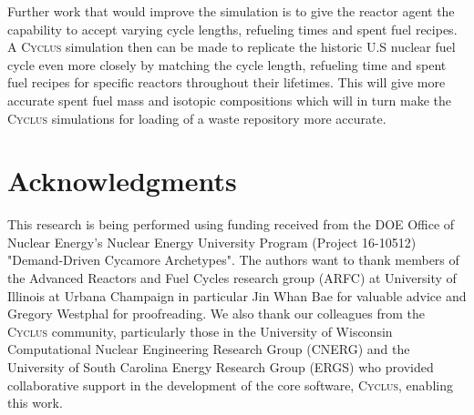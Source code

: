 \documentclass{anstrans}
\newcommand{\Cyclus}{\textsc{Cyclus}\xspace}%
\begin{document}
Further work that would improve the simulation is to give the reactor agent the capability to accept varying cycle lengths, refueling times and spent fuel recipes. A \Cyclus simulation then can be made to replicate the historic U.S nuclear fuel cycle even more closely by matching the cycle length, refueling time and spent fuel recipes for specific reactors throughout their lifetimes. This will give more accurate spent fuel mass and isotopic compositions which will in turn make the \Cyclus simulations for loading of a waste repository more accurate. 

\section{Acknowledgments}
This research is being performed using funding received from the DOE Office of Nuclear Energy's
Nuclear Energy University Program (Project 16-10512) "Demand-Driven Cycamore Archetypes". The authors want to thank members of the Advanced Reactors and Fuel Cycles research group (ARFC) at University of Illinois at Urbana Champaign in particular Jin Whan Bae for valuable advice and Gregory Westphal for proofreading. We also thank our colleagues from the \Cyclus community, particularly those in the University of Wisconsin Computational Nuclear Engineering Research Group (CNERG) and the University of South Carolina Energy Research Group (ERGS) who provided collaborative support in the development of the core software, \Cyclus, enabling this work. 



\end{document}

